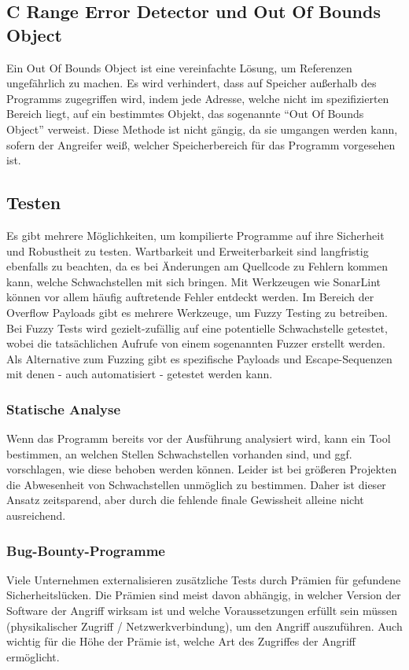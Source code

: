 \subsection{C Range Error Detector und Out Of Bounds Object}
Ein Out Of Bounds Object ist eine vereinfachte Lösung, um Referenzen ungefährlich zu machen.
Es wird verhindert, dass auf Speicher außerhalb des Programms zugegriffen wird, indem jede
Adresse, welche nicht im spezifizierten Bereich liegt, auf ein bestimmtes Objekt, das sogenannte
``Out Of Bounds Object'' verweist. Diese Methode ist nicht gängig, da sie
umgangen werden kann, sofern der Angreifer weiß, welcher Speicherbereich für das Programm
vorgesehen ist.



\subsection{Testen}
Es gibt mehrere Möglichkeiten, um kompilierte Programme auf ihre Sicherheit
und Robustheit zu testen. Wartbarkeit und Erweiterbarkeit
sind langfristig ebenfalls zu beachten, da es bei Änderungen am Quellcode
zu Fehlern kommen kann, welche Schwachstellen mit sich bringen.
Mit Werkzeugen wie SonarLint können vor allem häufig auftretende Fehler entdeckt
werden.
Im Bereich der Overflow Payloads gibt es mehrere Werkzeuge, um Fuzzy Testing
zu betreiben. Bei Fuzzy Tests wird gezielt-zufällig auf eine
potentielle Schwachstelle getestet, wobei die tatsächlichen Aufrufe
von einem sogenannten Fuzzer erstellt werden.
Als Alternative zum Fuzzing gibt es spezifische Payloads und
Escape-Sequenzen mit denen - auch automatisiert - getestet werden kann.

\subsubsection{Statische Analyse}
Wenn das Programm bereits vor der Ausführung analysiert wird, kann ein
Tool bestimmen, an welchen Stellen Schwachstellen vorhanden sind, und
ggf. vorschlagen, wie diese behoben werden können. Leider ist bei größeren
Projekten die Abwesenheit von Schwachstellen unmöglich zu bestimmen. 
Daher ist dieser Ansatz zeitsparend, aber durch die fehlende finale Gewissheit alleine nicht ausreichend.


\subsubsection{Bug-Bounty-Programme} \label{sec:bounties}
Viele Unternehmen externalisieren zusätzliche Tests durch Prämien für gefundene Sicherheitslücken.
Die Prämien sind meist davon abhängig, in welcher Version der Software der Angriff 
wirksam ist und welche Voraussetzungen erfüllt sein müssen (physikalischer Zugriff / Netzwerkverbindung),
um den Angriff auszuführen. Auch wichtig für die Höhe der Prämie ist, welche Art des Zugriffes
der Angriff ermöglicht.

